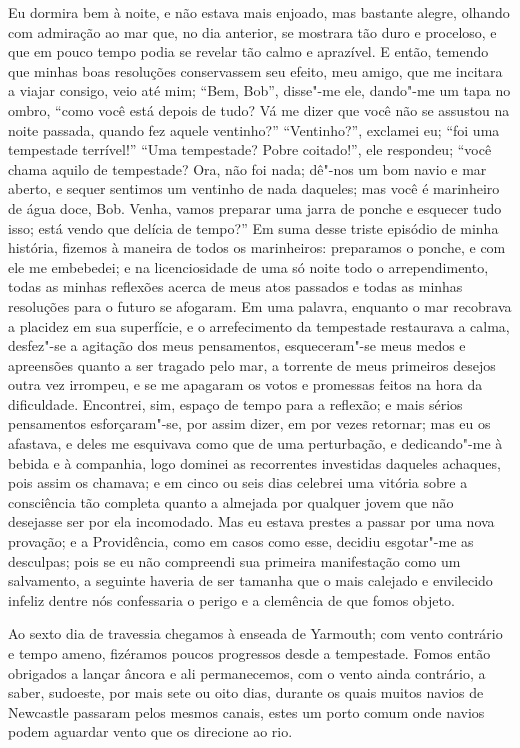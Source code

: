 Eu dormira bem à noite, e não estava mais enjoado, mas bastante alegre,
olhando com admiração ao mar que, no dia anterior, se mostrara tão duro
e proceloso, e que em pouco tempo podia se revelar tão calmo e
aprazível. E então, temendo que minhas boas resoluções conservassem seu
efeito, meu amigo, que me incitara a viajar consigo, veio até mim;
``Bem, Bob'', disse"-me ele, dando"-me um tapa no ombro, ``como você está
depois de tudo? Vá me dizer que você não se assustou na noite passada,
quando fez aquele ventinho?'' ``Ventinho?'', exclamei eu; ``foi uma
tempestade terrível!'' ``Uma tempestade? Pobre coitado!'', ele
respondeu; ``você chama aquilo de tempestade? Ora, não foi nada; dê"-nos
um bom navio e mar aberto, e sequer sentimos um ventinho de nada
daqueles; mas você é marinheiro de água doce, Bob. Venha, vamos preparar
uma jarra de ponche e esquecer tudo isso; está vendo que delícia de
tempo?'' Em suma desse triste episódio de minha história, fizemos à
maneira de todos os marinheiros: preparamos o ponche, e com ele me
embebedei; e na licenciosidade de uma só noite todo o arrependimento,
todas as minhas reflexões acerca de meus atos passados e todas as minhas
resoluções para o futuro se afogaram. Em uma palavra, enquanto o mar
recobrava a placidez em sua superfície, e o arrefecimento da tempestade
restaurava a calma, desfez"-se a agitação dos meus pensamentos,
esqueceram"-se meus medos e apreensões quanto a ser tragado pelo mar, a
torrente de meus primeiros desejos outra vez irrompeu, e se me apagaram
os votos e promessas feitos na hora da dificuldade. Encontrei, sim,
espaço de tempo para a reflexão; e mais sérios pensamentos
esforçaram"-se, por assim dizer, em por vezes retornar; mas eu os
afastava, e deles me esquivava como que de uma perturbação, e
dedicando"-me à bebida e à companhia, logo dominei as recorrentes
investidas daqueles achaques, pois assim os chamava; e em cinco ou seis
dias celebrei uma vitória sobre a consciência tão completa quanto a
almejada por qualquer jovem que não desejasse ser por ela incomodado.
Mas eu estava prestes a passar por uma nova provação; e a Providência,
como em casos como esse, decidiu esgotar"-me as desculpas; pois se eu não
compreendi sua primeira manifestação como um salvamento, a seguinte
haveria de ser tamanha que o mais calejado e envilecido infeliz dentre
nós confessaria o perigo e a clemência de que fomos objeto.

Ao sexto dia de travessia chegamos à enseada de Yarmouth; com vento
contrário e tempo ameno, fizéramos poucos progressos desde a tempestade.
Fomos então obrigados a lançar âncora e ali permanecemos, com o vento
ainda contrário, a saber, sudoeste, por mais sete ou oito dias, durante
os quais muitos navios de Newcastle passaram pelos mesmos canais, estes
um porto comum onde navios podem aguardar vento que os direcione ao rio.

